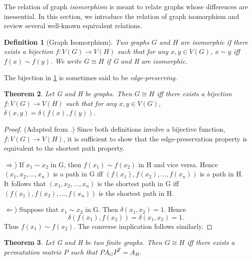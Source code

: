 \documentclass[12pt]{article}
\newtheorem{thm}{Theorem}[section]
\newtheorem{defn}[thm]{Definition}
\begin{document}
The relation of graph \emph{isomorphism} is meant to relate graphs
whose differences are inessential. In this section, we introduce the
relation of graph isomorphism and review several well-known equivalent
relations.

\begin{defn}[Graph Isomorphism]
  \label{def:ciso}
  Two graphs $G$ and $H$ are \emph{isomorphic} if there exists a
  bijection $f:V(G) \to V(H)$ such that for any $x, y \in V(G)$, $x
  \sim y$ iff $f(x) \sim f(y)$. We write $G\cong H$ if G and H are
  isomorphic.
\end{defn}

The bijection in \cref{def:ciso} is sometimes said to be
\emph{edge-preserving}.

\begin{thm}
  \label{thm:shortest}
  Let G and H be graphs. Then $G \cong H$ iff there exists a bijection
  $f:V(G) \to V(H)$ such that for any $x, y \in V(G)$, $\delta(x, y) =
  \delta(f(x), f(y))$.
\end{thm}

\begin{proof}
(Adapted from \cite{ss2014}.) Since both definitions involve a
  bijective function, $f:V(G) \to V(H)$, it is sufficient to show that
  the edge-preservation property is equivalent to the shortest path
  property. 

$\Rightarrow$) If $x_1 \sim x_2$ in G, then $f(x_1) \sim f(x_2)$ in H
and vice versa. Hence $(x_1, x_2, ..., x_n)$ is a path in G iff
$(f(x_1), f(x_2), ..., f(x_n))$ is a path in H. It follows that $(x_1,
x_2, ..., x_n)$ is the shortest path in G iff $(f(x_1), f(x_2), ...,
f(x_n))$ is the shortest path in H.

$\Leftarrow$) Suppose that $x_1 \sim x_2$ in G. Then $\delta(x_1, x_2)
= 1$. Hence 
\[
\delta (f(x_1),f(x_2)) = \delta (x_1,x_2)=1. 
\]
Thus
$f(x_1) \sim f(x_2)$. The converse implication follows similarly.
\end{proof}

\begin{thm}
  \label{thm:permutation}
  Let G and H be two finite graphs. Then $G \cong H$ iff there exists
  a permutation matrix $P$ such that $PA_GP^T = A_H$.
\end{thm}
\end{document}
